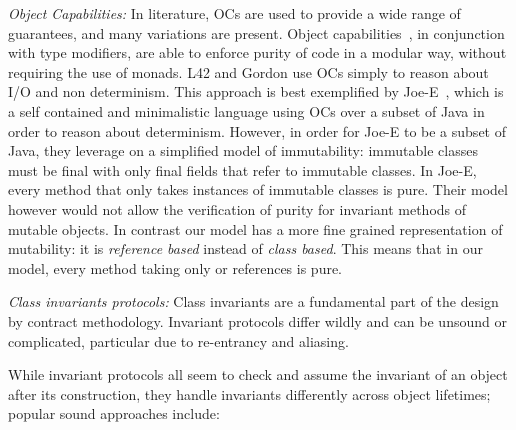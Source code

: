 \textit{Object Capabilities:}
In literature, OCs are used to provide a wide range of guarantees, and many variations are present.
Object capabilities~\cite{RobustComposition}, in conjunction with type modifiers, are able to
 enforce purity of code in a modular way, without requiring the use of monads.
L42 and Gordon use OCs simply to reason about I/O and non determinism. This approach is best exemplified by Joe-E~\cite{finifter2008verifiable}, which is a self contained and minimalistic language using OCs over a subset of Java in order to reason about determinism.
However, in order for Joe-E to be a subset of Java, they leverage on a simplified model of immutability:
immutable classes must be final with only final fields that refer to immutable classes.
In Joe-E, every method that only takes instances of immutable classes is pure.
Their model however would not allow the verification of purity for invariant methods of mutable objects.
In contrast our model has a more fine grained representation of mutability: it is \emph{reference based} instead of \emph{class based}. This means that in our model, every method taking only \Q@read@ or \Q@imm@ references is pure.

\textit{Class invariants protocols:}
Class invariants are a fundamental part of the design by contract methodology. 
Invariant protocols differ wildly and can be unsound or complicated, particular due to re-entrancy and aliasing\cite{leino2004object,drossopoulou2008unified, meyer2016class}. 

While invariant protocols all seem to 
check and assume the invariant of an object after its construction, they handle invariants differently across object lifetimes; popular sound approaches include:


